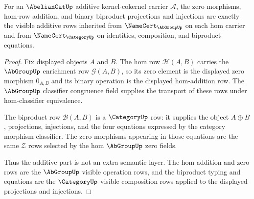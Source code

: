\begin{theorem}
\label{thm:abeliancat-additive-zero-biproduct-obligation}
For an $\AbelianCatUp$ additive kernel-cokernel carrier $\mathcal A$, the zero
morphisms, hom-row addition, and binary biproduct projections and injections
are exactly the visible additive rows inherited from
$\NameCert_{\AbGroupUp}$ on each hom carrier and from
$\NameCert_{\CategoryUp}$ on identities, composition, and biproduct equations.
\end{theorem}
\begin{proof}
Fix displayed objects $A$ and $B$. The hom row $\mathcal H(A,B)$ carries the
$\AbGroupUp$ enrichment row $\mathcal G(A,B)$, so its zero element is the
displayed zero morphism $0_{A,B}$ and its binary operation is the displayed
hom-addition row. The $\AbGroupUp$ classifier congruence field supplies the
transport of these rows under hom-classifier equivalence.

The biproduct row $\mathcal B(A,B)$ is a $\CategoryUp$ row: it supplies the
object $A\oplus B$, projections, injections, and the four equations expressed
by the category morphism classifier. The zero morphisms appearing in those
equations are the same $\mathcal Z$ rows selected by the hom
$\AbGroupUp$ zero fields.

Thus the additive part is not an extra semantic layer. The hom addition and
zero rows are the $\AbGroupUp$ visible operation rows, and the biproduct
typing and equations are the $\CategoryUp$ visible composition rows applied to
the displayed projections and injections.
\end{proof}

